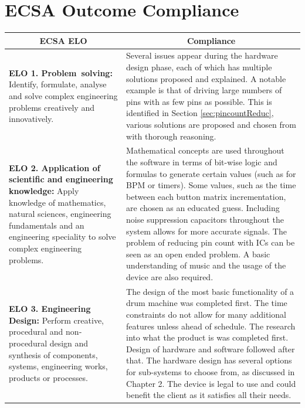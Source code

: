\documentclass[12pt,a4paper]{report}
\begin{document}
\chapter{ECSA Outcome Compliance}

\begin{longtable}[c]{|m{}|m{}|}
	\hline
	\multicolumn{1}{|c|}{\textbf{ECSA ELO}} & \multicolumn{1}{c|}{\textbf{Compliance}} \\
	\hline
	\endhead
	
	
	\textbf{ELO 1. Problem solving:} \newline Identify, formulate, analyse and solve complex engineering problems creatively and innovatively.& Several issues appear during the hardware design phase, each of which has multiple solutions proposed and explained. A notable example is that of driving large numbers of pins with as few pins as possible. This is identified in Section \ref{sec:pincountReduc}, various solutions are proposed and chosen from with thorough reasoning. \\
	\hline
	\textbf{ELO 2. Application of scientific and engineering knowledge:} \newline Apply knowledge of mathematics, natural sciences, engineering fundamentals and an engineering speciality to solve complex engineering problems. & Mathematical concepts are used throughout the software in terms of bit-wise logic and formulas to generate certain values (such as for BPM or timers). Some values, such as the time between each button matrix incrementation, are chosen as an educated guess. Including noise suppression capacitors throughout the system allows for more accurate signals. The problem of reducing pin count with ICs can be seen as an open ended problem. A basic understanding of music and the usage of the device are also required. \\
	\hline
	\textbf{ELO 3. Engineering Design:} \newline Perform creative, procedural and non‐procedural design and synthesis of components, systems, engineering works, products or processes.& The design of the most basic functionality of a drum machine was completed first. The time constraints do not allow for many additional features unless ahead of schedule. The research into what the product is was completed first. Design of hardware and software followed after that. The hardware design has several options for sub-systems to choose from, as discussed in Chapter 2. The device is legal to use and could benefit the client as it satisfies all their needs. \\

\end{longtable}
\end{document}

